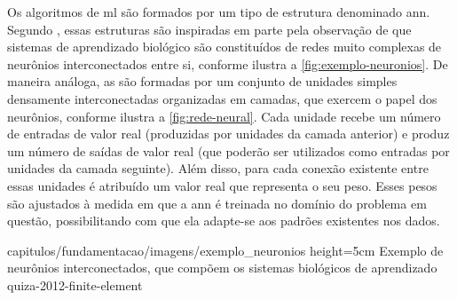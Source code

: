 



Os algoritmos de \acrshort{ml} são formados por um tipo de estrutura denominado \acrfull{ann}. 
Segundo , essas estruturas são inspiradas em parte pela observação de que sistemas de aprendizado biológico são constituídos de redes muito complexas de neurônios interconectados entre si, conforme ilustra a \autoref{fig:exemplo-neuronios}.
De maneira análoga, as  são formadas por um conjunto de unidades simples densamente interconectadas organizadas em camadas, que exercem o papel dos neurônios, conforme ilustra a \autoref{fig:rede-neural}. 
Cada unidade recebe um número de entradas de valor real (produzidas por unidades da camada anterior) e produz um número de saídas de valor real (que poderão ser utilizados como entradas por unidades da camada seguinte).
Além disso, para cada conexão existente entre essas unidades é atribuído um valor real que representa o seu peso. Esses pesos são ajustados à medida em que a \acrshort{ann} é treinada no domínio do problema em questão, possibilitando com que ela adapte-se aos padrões existentes nos dados.

    {capitulos/fundamentacao/imagens/exemplo_neuronios} %
    {height=5cm} %
    {Exemplo de neurônios interconectados, que compõem os sistemas biológicos de aprendizado} %
    {quiza-2012-finite-element} %

